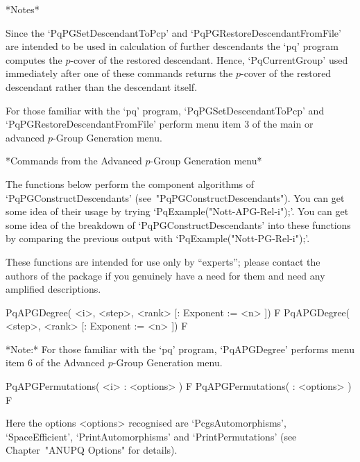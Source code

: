 *Notes*

Since the  `PqPGSetDescendantToPcp'  and  `PqPGRestoreDescendantFromFile'
are intended to be used in calculation of further  descendants  the  `pq'
program computes  the  $p$-cover  of  the  restored  descendant.   Hence,
`PqCurrentGroup' used immediately after one of these commands returns the
$p$-cover of the restored descendant rather than the descendant itself.

For those familiar with the `pq'  program,  `PqPGSetDescendantToPcp'  and
`PqPGRestoreDescendantFromFile' perform  menu  item  3  of  the  main  or
advanced $p$-Group Generation menu.

\goodbreak%
*Commands from the Advanced $p$-Group Generation menu*

The   functions   below   perform    the    component    algorithms    of
`PqPGConstructDescendants' (see~"PqPGConstructDescendants"). You can  get
some idea of their usage by  trying  `PqExample("Nott-APG-Rel-i");'.  You
can get some idea of the  breakdown  of  `PqPGConstructDescendants'  into
these   functions    by    comparing    the    previous    output    with
`PqExample("Nott-PG-Rel-i");'. 

These functions are intended for  use only by ``experts''; please contact
the authors of the package if you genuinely have a need for them and need
any amplified descriptions.

\>PqAPGDegree( <i>, <step>, <rank> [: Exponent := <n> ]) F
\>PqAPGDegree( <step>, <rank> [: Exponent := <n> ]) F


*Note:* For those familiar with the `pq' program,  `PqAPGDegree'  performs
menu item 6 of the Advanced $p$-Group Generation menu.

\>PqAPGPermutations( <i> : <options> ) F
\>PqAPGPermutations( : <options> ) F


Here   the   options   <options>  recognised   are   `PcgsAutomorphisms',
`SpaceEfficient',   `PrintAutomorphisms'  and   `PrintPermutations'  (see
Chapter~"ANUPQ Options" for details).

